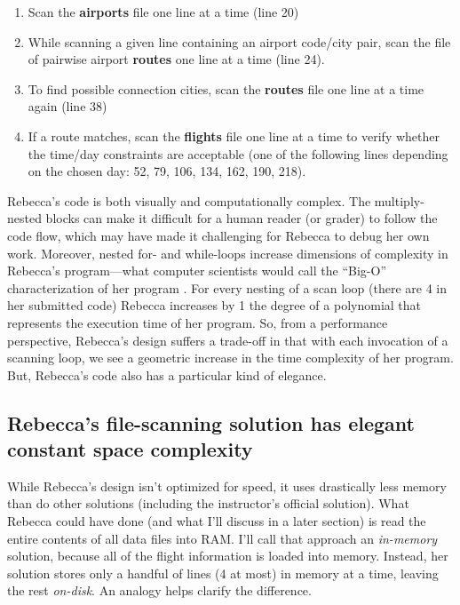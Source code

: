 \begin{enumerate}
\def\labelenumi{\arabic{enumi}.}
\tightlist
\item
  Scan the \textbf{airports} file one line at a time (line 20)
\item
  While scanning a given line containing an airport code/city pair, scan the file of pairwise airport \textbf{routes} one line at a time (line 24).
\item
  To find possible connection cities, scan the \textbf{routes} file one line at a time again (line 38)
\item
  If a route matches, scan the \textbf{flights} file one line at a time to verify whether the time/day constraints are acceptable (one of the following lines depending on the chosen day: 52, 79, 106, 134, 162, 190, 218).
\end{enumerate}

Rebecca's code is both visually and computationally complex. The multiply-nested blocks can make it difficult for a human reader (or grader) to follow the code flow, which may have made it challenging for Rebecca to debug her own work. Moreover, nested for- and while-loops increase dimensions of complexity in Rebecca's program---what computer scientists would call the ``Big-O'' characterization of her program \citep{cormen_introduction_1990}. For every nesting of a scan loop (there are 4 in her submitted code) Rebecca increases by 1 the degree of a polynomial that represents the execution time of her program. So, from a performance perspective, Rebecca's design suffers a trade-off in that with each invocation of a scanning loop, we see a geometric increase in the time complexity of her program. But, Rebecca's code also has a particular kind of elegance.

\subsection{Rebecca's file-scanning solution has elegant constant space complexity}\label{rebeccas-file-scanning-solution-has-elegant-constant-space-complexity}

While Rebecca's design isn't optimized for speed, it uses drastically less memory than do other solutions (including the instructor's official solution). What Rebecca could have done (and what I'll discuss in a later section) is read the entire contents of all data files into RAM. I'll call that approach an \emph{in-memory} solution, because all of the flight information is loaded into memory. Instead, her solution stores only a handful of lines (4 at most) in memory at a time, leaving the rest \emph{on-disk}. An analogy helps clarify the difference.

